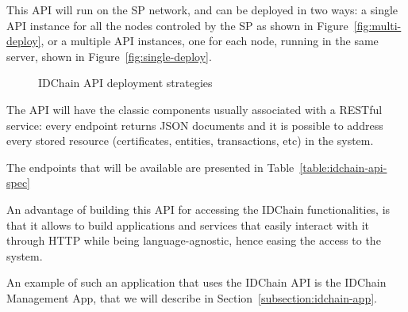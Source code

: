 This \ac{API} will run on the \ac{SP} network, and can be deployed in two ways: a single API instance for all the nodes controled by the \ac{SP} as shown in Figure~\ref{fig:multi-deploy}, or a multiple API instances, one for each node, running in the same server, shown in Figure~\ref{fig:single-deploy}.

\begin{figure}[htb]
  \centering
  \caption{IDChain API deployment strategies}
\end{figure}

The \ac{API} will have the classic components usually associated with a RESTful service: every endpoint returns JSON documents and it is possible to address every stored resource (certificates, entities, transactions, etc) in the system.

The endpoints that will be available are presented in Table~\ref{table:idchain-api-spec}

An advantage of building this \ac{API} for accessing the IDChain functionalities, is that it allows to build applications and services that easily interact with it through \ac{HTTP} while being language-agnostic, hence easing the access to the system.

An example of such an application that uses the IDChain API is the IDChain Management App, that we will describe in Section~\ref{subsection:idchain-app}.

